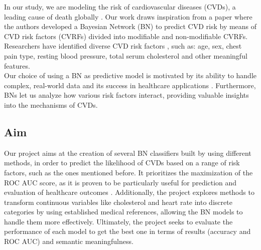 \documentclass[letterpaper]{article}
\begin{document}
In our study, we are modeling the risk of cardiovascular diseases (CVDs), a leading cause of death globally \cite{WHO2024}.
Our work draws inspiration from a paper \cite{ORDOVAS2023107405} where the authors developed a Bayesian Network (BN) to predict CVD risk by means of CVD risk factors (CVRFs) divided into modifiable and non-modifiable CVRFs.
Researchers have identified diverse CVD risk factors \cite{MAHMOOD2014999}, such as: age, sex, chest pain type, resting blood pressure, total serum cholesterol and other meaningful features.\\
Our choice of using a BN as predictive model is motivated by its ability to handle complex, real-world data and its success in healthcare applications \cite{nielsen2009bayesian}. Furthermore, BNs let us analyze how various risk factors interact, providing valuable insights into the mechanisms of CVDs.


\subsection{Aim}

Our project aims at the creation of several BN classifiers built by using different methods, in order to predict the likelihood of CVDs based on a range of risk factors, such as the ones mentioned before. It prioritizes the maximization of the ROC AUC score, as it is proven to be particularly useful for prediction and evaluation of healthcare outcomes \cite{Marcusson}. Additionally, the project explores methods to transform continuous variables like cholesterol and heart rate into discrete categories by using established medical references, allowing the BN models to handle them more effectively. Ultimately, the project seeks to evaluate the performance of each model to get the best one in terms of results (accuracy and ROC AUC) and semantic meaningfulness.
\end{document}
